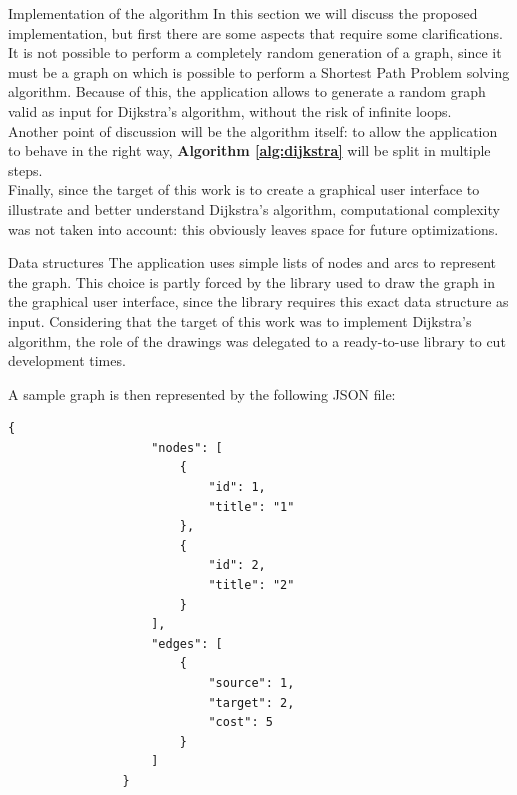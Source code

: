 \documentclass[9pt]{extarticle}
\begin{document}
    \begin{section}{Implementation of the algorithm}
        In this section we will discuss the proposed implementation, but first there are some aspects that require some 
        clarifications. 
        It is not possible to perform a completely random generation of a graph, since it must be a graph on which is 
        possible to perform a Shortest Path Problem solving algorithm.
        Because of this, the application allows to generate a random graph valid as input for Dijkstra's algorithm, without 
        the risk of infinite loops. \\
        Another point of discussion will be the algorithm itself: to allow the application to behave in the right way, 
        \textbf{Algorithm \ref{alg:dijkstra}} will be split in multiple steps. \\
        Finally, since the target of this work is to create a graphical user interface to illustrate and better understand
        Dijkstra's algorithm, computational complexity was not taken into account: this obviously leaves space for future 
        optimizations.

        \begin{subsection}{Data structures}
            The application uses simple lists of nodes and arcs to represent the graph.
            This choice is partly forced by the library\cite{github:digraph} used to draw the graph in the graphical user 
            interface, since the library requires this exact data structure as input.
            Considering that the target of this work was to implement Dijkstra's algorithm, the role of the drawings was delegated to
            a ready-to-use library to cut development times.

            A sample graph is then represented by the following JSON file:

            \vspace{10px}
            \begin{lstlisting}[style=json,caption={JSON file example},captionpos=b,label={data:json}]
                {
                    "nodes": [
                        {
                            "id": 1,
                            "title": "1"
                        },
                        {
                            "id": 2,
                            "title": "2"
                        }
                    ],
                    "edges": [
                        {
                            "source": 1,
                            "target": 2,
                            "cost": 5
                        }
                    ]
                }
            \end{lstlisting}
            \vspace{20px}
            

\end{subsection}
\end{section}
\end{document}
